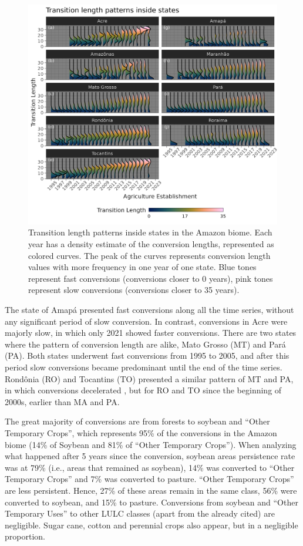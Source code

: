 \documentclass[essd, manuscript]{copernicus}
\begin{document}
\begin{figure}[h]
\includegraphics[width=17cm]{figs/trans_ridge} \caption{Transition length patterns inside states in the Amazon biome. Each year has a density estimate of the conversion lengths, represented as colored curves. The peak of the curves represents conversion length values with more frequency in one year of one state. Blue tones represent fast conversions (conversions closer to 0 years), pink tones represent slow conversions (conversions closer to 35 years).}\label{fig:transridge-plot}
\end{figure}

The state of Amapá presented fast conversions along all the time series, without any significant period of slow conversion.
In contrast, conversions in Acre were majorly slow, in which only 2021 showed faster conversions.
There are two states where the pattern of conversion length are alike, Mato Grosso (MT) and Pará (PA).
Both states underwent fast conversions from 1995 to 2005, and after this period slow conversions became predominant until the end of the time series.
Rondônia (RO) and Tocantins (TO) presented a similar pattern of MT and PA, in which conversions decelerated , but for RO and TO since the beginning of 2000s, earlier than MA and PA.

The great majority of conversions are from forests to soybean and ``Other Temporary Crops'', which represents 95\% of the conversions in the Amazon biome (14\% of Soybean and 81\% of ``Other Temporary Crops'').
When analyzing what happened after 5 years since the conversion, soybean areas persistence rate was at 79\% (i.e., areas that remained as soybean), 14\% was converted to ``Other Temporary Crops'' and 7\% was converted to pasture.
``Other Temporary Crops'' are less persistent.
Hence, 27\% of these areas remain in the same class, 56\% were converted to soybean, and 15\% to pasture.
Conversions from soybean and ``Other Temporary Uses'' to other LULC classes (apart from the already cited) are negligible.
Sugar cane, cotton and perennial crops also appear, but in a negligible proportion.
\end{document}

